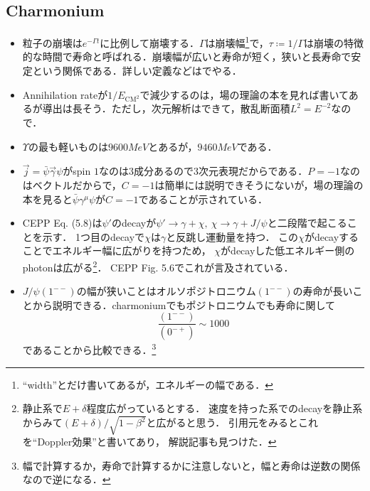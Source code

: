 \subsection{Charmonium}
\begin{itemize}
		\item 粒子の崩壊は$e^{-\Gamma t} $に比例して崩壊する．$\Gamma $は崩壊幅\footnote{``width''とだけ書いてあるが，エネルギーの幅である．}で，$\tau \coloneqq 1/\Gamma $は崩壊の特徴的な時間で寿命と呼ばれる．崩壊幅が広いと寿命が短く，狭いと長寿命で安定という関係である．詳しい定義などは\cite[Chap.7]{Peskin:2019iig}でやる．
		\item Annihilation rateが$1/E_{\mathrm{CM}^2}$で減少するのは，場の理論の本を見れば書いてあるが導出は長そう\cite[Chap1, Chap5]{Peskin:1995ev}．ただし，次元解析はできて，散乱断面積$\unit{L^2} = \unit{E^{-2}} $なので．
		\item $\Upsilon $の最も軽いものは$9600\unit{MeV} $とあるが，$9460\unit{MeV} $である．
		\item $\vec{j} = \bar{\psi}\vec{\gamma}\psi $がspin $1 $なのは$3 $成分あるので$3 $次元表現だからである．$P=-1 $なのはベクトルだからで，$C=-1 $は簡単には説明できそうにないが，場の理論の本を見ると$\bar{\psi}\gamma^{\mu}\psi $が$C=-1 $であることが示されている\cite[Chap.3]{Peskin:1995ev}．
		\item CEPP Eq. (5.8)は$\psi' $のdecayが$\psi'\to \gamma + \chi, \ \chi \to \gamma + J/\psi $と二段階で起こることを示す．
				1つ目のdecayで$\chi $は$\gamma $と反跳し運動量を持つ．
				この$\chi $がdecayすることでエネルギー幅に広がりを持つため，
				$\chi $がdecayした低エネルギー側のphotonは広がる\footnote{
						静止系で$E + \delta $程度広がっているとする．
						速度を持った系でのdecayを静止系からみて$(E + \delta)/\sqrt{1-\beta^2} $と広がると思う．
						引用元\cite{Tanenbaum1978}をみるとこれを``Doppler効果''と書いてあり，
						解説記事\cite{1979342}も見つけた．
				}．
				CEPP Fig. 5.6でこれが言及されている．
		\item $J/\psi(1^{--}) $の幅が狭いことはオルソポジトロニウム$(1^{--}) $の寿命が長いことから説明できる．charmoniumでもポジトロニウムでも寿命に関して
				\begin{equation}
						\frac{(1^{--})}{(0^{-+})} \sim 1000
				\end{equation}
				であることから比較できる．\footnote{幅で計算するか，寿命で計算するかに注意しないと，幅と寿命は逆数の関係なので逆になる．}
\end{itemize}
